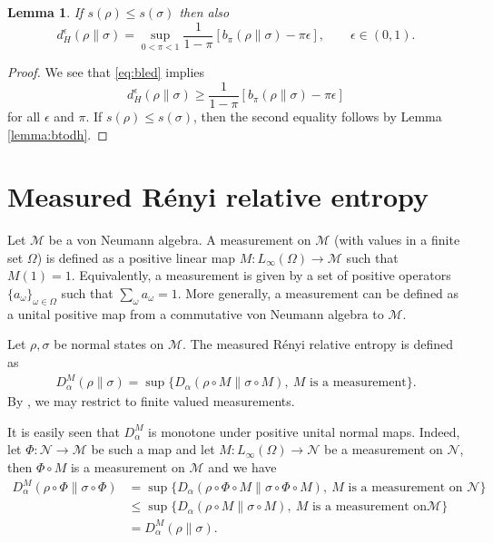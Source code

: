 \documentclass[12pt]{article}
\newtheorem{lemma}{Lemma}
\theoremstyle{definition}
\theoremstyle{remark}
\def\Me{\mathcal M}
\def\Ne{\mathcal N}
\begin{document}
\begin{lemma}\label{lemma:btodh_fd} 
If $s(\rho)\le s(\sigma)$ then also
\[
d_H^\epsilon(\rho\|\sigma)=\sup_{0<\pi<1}\frac{1}{1-\pi}
[b_\pi(\rho\|\sigma)-\pi\epsilon],\qquad \epsilon\in (0,1).
\]


\end{lemma}

\begin{proof}
We see that \eqref{eq:bled}
implies 
\[
d_H^\epsilon(\rho\|\sigma)\ge \frac{1}{1-\pi}[b_\pi(\rho\|\sigma)-\pi\epsilon]
\]
for all $\epsilon$ and $\pi$. If $s(\rho)\le s(\sigma)$, then the second equality follows
by Lemma \ref{lemma:btodh}.


\end{proof}


\section{Measured R\'enyi relative entropy}

Let $\Me$ be a von Neumann algebra. A measurement on $\Me$ (with values in a finite set
$\Omega$) is defined as a positive linear map $M:L_\infty(\Omega)\to \Me$ such that
$M(1)=1$. Equivalently, a measurement is given by a set of positive operators
$\{a_\omega\}_{\omega\in \Omega}$ such that $\sum_\omega a_\omega=1$. More generally, a
measurement can be defined as a unital positive map from a commutative von Neumann algebra
to $\Me$. 

Let $\rho,\sigma$ be normal states on $\Me$. The measured R\'enyi relative entropy is defined as
\begin{align*}
D_\alpha^M(\rho\|\sigma)=\sup\{D_\alpha(\rho\circ M\|\sigma\circ M),\ M \text{ is a
measurement}\}.
\end{align*}
By \cite[Thm. 5.2]{hiai2021quantum}, we may restrict to finite valued measurements. 

It is easily seen that $D_\alpha^M$ is monotone under positive unital normal maps. Indeed, let
$\Phi:\Ne\to \Me$ be such a map and let $M:L_\infty(\Omega)\to \Ne$ be a measurement on
$\Ne$, then $\Phi\circ M$ is a measurement on $\Me$ and we have
\begin{align*}
D^M_\alpha(\rho\circ\Phi\|\sigma\circ\Phi)&=\sup\{D_\alpha(\rho\circ \Phi\circ
M\|\sigma\circ\Phi\circ M),\ M \text{ is a measurement on } \Ne\}\\
&\le
\sup\{D_\alpha(\rho\circ M\|\sigma\circ M),\ M \text{ is a measurement on
}\Me\}\\
&=D^M_\alpha(\rho\|\sigma).
\end{align*}
\end{document}
